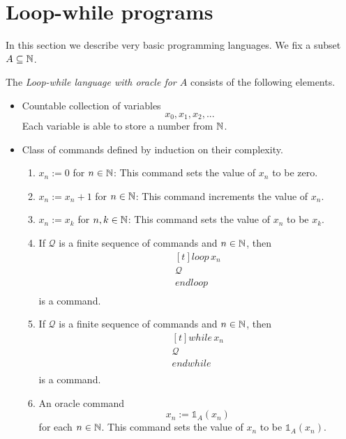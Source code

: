 \documentclass[10pt]{amsart}
\begin{document}
\section{Loop-while programs}
\noindent
In this section we describe very basic programming languages. We fix a subset $A \subseteq {\mathbb N}$.

\begin{definition}
	The \textit{Loop-while language with oracle for $A$} consists of the following elements.
	\begin{itemize}
		\item Countable collection of variables
		      $$x_0,x_1,x_2,...$$
		      Each variable is able to store a number from ${\mathbb N}$.
		\item Class of commands defined by induction on their complexity.
		      \begin{enumerate}[label=\textbf{(\arabic*)}, leftmargin=3.0em]
			      \item $x_n := 0$ for $n\in {\mathbb N}$: This command sets the value of $x_n$ to be zero.
			      \item $x_n := x_n + 1$ for $n \in {\mathbb N}$: This command increments the value of $x_n$.
			      \item $x_n := x_k$ for $n,k \in {\mathbb N}$: This command sets the value of $x_n$ to be $x_k$.
			      \item If $\mathcal{Q}$ is a finite sequence of commands and $n\in {\mathbb N}$, then
			            $$\begin{aligned}[t]
					            \mathit{loop}\,x_n \\
					            \mathcal{Q}        \\
					            \mathit{endloop}   \\
				            \end{aligned}$$
			            is a command.
			      \item If $\mathcal{Q}$ is a finite sequence of commands and $n \in {\mathbb N}$, then
			            $$\begin{aligned}[t]
					            \mathit{while}\,x_n \\
					            \mathcal{Q}         \\
					            \mathit{endwhile}   \\
				            \end{aligned}$$
			            is a command.
			      \item An oracle command
			            $$x_n := \mathbb{1}_A(x_n)$$
			            for each $n \in {\mathbb N}$. This command sets the value of $x_n$ to be $\mathbb{1}_A(x_n)$.
		      \end{enumerate}
	\end{itemize}
\end{definition}
\end{document}
